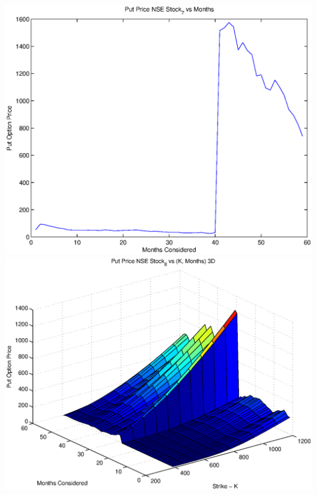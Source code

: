 \documentclass{article}
\begin{document}
\includegraphics[width=\textwidth]{Put_Price_NSE_Stock_7_vs_Months} \\

\includegraphics[width=\textwidth]{Put_Price_NSE_Stock_8_vs_(K,_Months)_3D} \\
\end{document}
